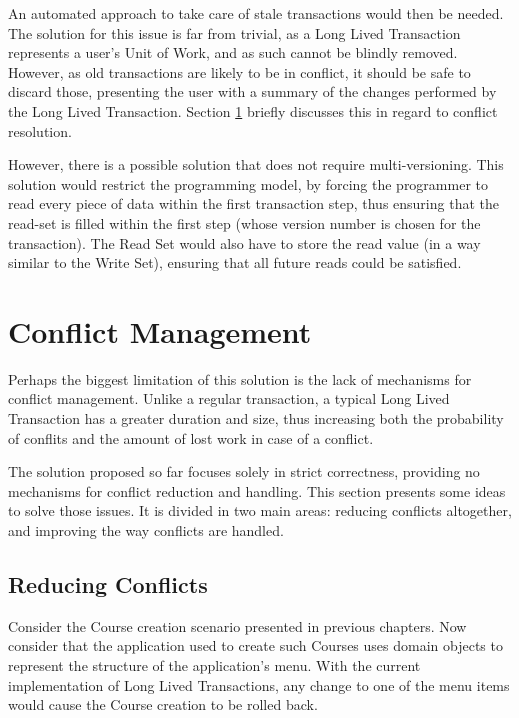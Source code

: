 An automated approach to take care of stale transactions would then be
needed. The solution for this issue is far from trivial, as a Long
Lived Transaction represents a user's Unit of Work, and as such cannot
be blindly removed. However, as old transactions are likely to be in
conflict, it should be safe to discard those, presenting the user with
a summary of the changes performed by the Long Lived
Transaction. Section \ref{sec:conflicts} briefly discusses this in
regard to conflict resolution.

However, there is a possible solution that does not require
multi-versioning. This solution would restrict the programming model,
by forcing the programmer to read every piece of data within the first
transaction step, thus ensuring that the read-set is filled within the
first step (whose version number is chosen for the transaction). The
Read Set would also have to store the read value (in a way similar to
the Write Set), ensuring that all future reads could be satisfied.

\section{Conflict Management}
\label{sec:conflicts}

Perhaps the biggest limitation of this solution is the lack of
mechanisms for conflict management. Unlike a regular transaction, a
typical Long Lived Transaction has a greater duration and size, thus
increasing both the probability of conflits and the amount of lost
work in case of a conflict.

The solution proposed so far focuses solely in strict correctness,
providing no mechanisms for conflict reduction and handling. This
section presents some ideas to solve those issues. It is divided in
two main areas: reducing conflicts altogether, and improving the way
conflicts are handled.

\subsection{Reducing Conflicts}

Consider the Course creation scenario presented in previous
chapters. Now consider that the application used to create such
Courses uses domain objects to represent the structure of the
application's menu. With the current implementation of Long Lived
Transactions, any change to one of the menu items would cause the
Course creation to be rolled back.

